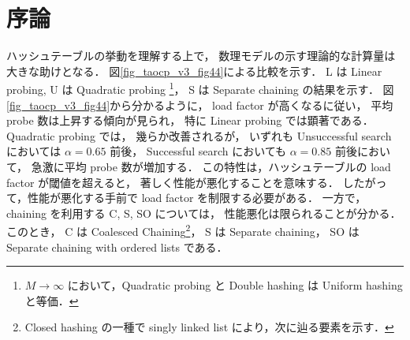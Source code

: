 \chapter{序論}
\label{chap_Introduction}

ハッシュテーブルの挙動を理解する上で，
数理モデルの示す理論的な計算量は大きな助けとなる．
図\ref{fig_taocp_v3_fig44}に\cite{knuth1998}よる比較を示す．
L は Linear probing,
U は Quadratic probing \footnote{$M \rightarrow \infty$ において，Quadratic probing と Double hashing は Uniform hashing と等価．}，
S は Separate chaining の結果を示す．
図\ref{fig_taocp_v3_fig44}から分かるように，
load factor が高くなるに従い，
平均 probe 数は上昇する傾向が見られ，
特に Linear probing では顕著である．
Quadratic probing では，
幾らか改善されるが，
いずれも
Unsuccessful search においては $\alpha = 0.65$ 前後，
Successful search においても $\alpha = 0.85$ 前後において，
急激に平均 probe 数が増加する．
この特性は，ハッシュテーブルの load factor が閾値を超えると，
著しく性能が悪化することを意味する．
したがって，性能が悪化する手前で load factor を制限する必要がある．
一方で，chaining を利用する C, S, SO については，
性能悪化は限られることが分かる．
このとき，
C は Coalesced Chaining\footnote{Closed hashing の一種で singly linked list により，次に辿る要素を示す．}，
S は Separate chaining，
SO は Separate chaining with ordered lists である．




